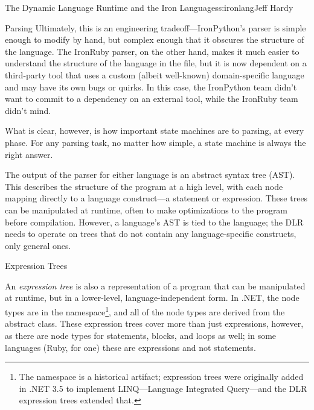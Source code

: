 \begin{aosachapter}{The Dynamic Language Runtime and the Iron Languages}{s:ironlang}{Jeff Hardy}
\begin{aosasect1}{Parsing}
Ultimately, this is an engineering tradeoff---IronPython's parser is simple
enough to modify by hand, but complex enough that it obscures the structure of
the language. The IronRuby parser, on the other hand, makes it much easier to
understand the structure of the language in the  file, but it is
now dependent on a third-party tool that uses a custom (albeit well-known)
domain-specific language and may have its own bugs or quirks. In this case, the
IronPython team didn't want to commit to a dependency on an external tool, 
while the
IronRuby team didn't mind.

What is clear, however, is how important state machines are to parsing, at
every phase. For any parsing task, no matter how simple, a state machine is
always the right answer.

The output of the parser for either language is an abstract syntax tree (AST).
This describes the structure of the program at a high level, with each node
mapping directly to a language construct---a statement or expression.  These
trees can be manipulated at runtime, often to make optimizations to the program
before compilation. However, a language's AST is tied to the language; the DLR
needs to operate on trees that do not contain any language-specific constructs,
only general ones.

\end{aosasect1}

\begin{aosasect1}{Expression Trees}

An \emph{expression tree} is also a representation of a program that can be
manipulated at \linebreak 
runtime, but in a lower-level, language-independent form. In
.NET, the node types are in the \linebreak 
{}
namespace\footnote{The namespace is a historical artifact; expression trees
were originally added in .NET 3.5 to implement LINQ---Language Integrated
Query---and the DLR expression trees extended that.}, and all of the node types
are derived from the abstract  class. These expression trees
cover more than just expressions, however, as there are node types for
 statements,  blocks, and loops as well; in some languages
(Ruby, for one) these are expressions and not statements.


\end{aosasect1}
\end{aosachapter}
